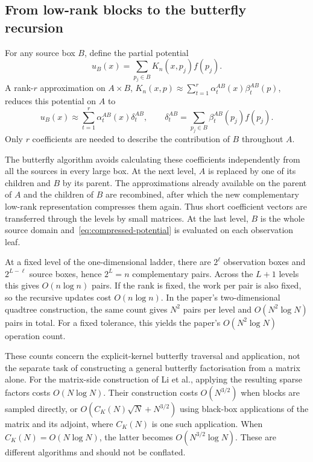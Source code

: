 \documentclass[11pt,a4paper]{article}
\numberwithin{equation}{section}
\begin{document}
\subsection{From low-rank blocks to the butterfly recursion}
\label{subsec:butterfly-recursion}

For any source box $B$, define the partial potential
\begin{equation}
    u_B(x)=\sum_{p_j\in B}K_n(x,p_j)f(p_j).
\end{equation}
A rank-$r$ approximation on $A\times B$,
$K_n(x,p)\approx\sum_{t=1}^{r}\alpha_t^{AB}(x)\beta_t^{AB}(p)$, reduces this potential on $A$ to
\begin{equation}
    u_B(x)\approx\sum_{t=1}^{r}\alpha_t^{AB}(x)\delta_t^{AB},
    \qquad
    \delta_t^{AB}=\sum_{p_j\in B}\beta_t^{AB}(p_j)f(p_j).
    \label{eq:compressed-potential}
\end{equation}
Only $r$ coefficients are needed to describe the contribution of $B$ throughout $A$.

The butterfly algorithm avoids calculating these coefficients independently from all the sources in every large box. At the next level, $A$ is replaced by one of its children and $B$ by its parent. The approximations already available on the parent of $A$ and the children of $B$ are recombined, after which the new complementary low-rank representation compresses them again. Thus short coefficient vectors are transferred through the levels by small matrices. At the last level, $B$ is the whole source domain and~\eqref{eq:compressed-potential} is evaluated on each observation leaf.

At a fixed level of the one-dimensional ladder, there are $2^\ell$ observation boxes and $2^{L-\ell}$ source boxes, hence $2^L=n$ complementary pairs. Across the $L+1$ levels this gives $O(n\log n)$ pairs. If the rank is fixed, the work per pair is also fixed, so the recursive updates cost $O(n\log n)$. In the paper's two-dimensional quadtree construction, the same count gives $N^2$ pairs per level and $O(N^2\log N)$ pairs in total. For a fixed tolerance, this yields the paper's $O(N^2\log N)$ operation count.

These counts concern the explicit-kernel butterfly traversal and application, not the separate task of constructing a general butterfly factorisation from a matrix alone. For the matrix-side construction of Li et al., applying the resulting sparse factors costs $O(N\log N)$. Their construction costs $O(N^{3/2})$ when blocks are sampled directly, or $O(C_K(N)\sqrt N+N^{3/2})$ using black-box applications of the matrix and its adjoint, where $C_K(N)$ is one such application. When $C_K(N)=O(N\log N)$, the latter becomes $O(N^{3/2}\log N)$. These are different algorithms and should not be conflated.
\end{document}
